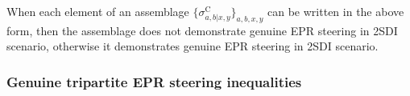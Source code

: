 \documentclass[reprint,superscriptaddress,nofootinbib,amsmath,amssymb,aps,pra,longbibliography]{revtex4-1}
\begin{document}
When each element of an assemblage $\{\sigma^{\text{C}}_{a,b|x, y}\}_{a,b,x,y}$ can be written in the above form, then the assemblage does not demonstrate genuine EPR steering in 2SDI scenario, otherwise it demonstrates genuine EPR steering in 2SDI scenario.   %



\subsubsection{Genuine tripartite EPR steering inequalities}
\end{document}
